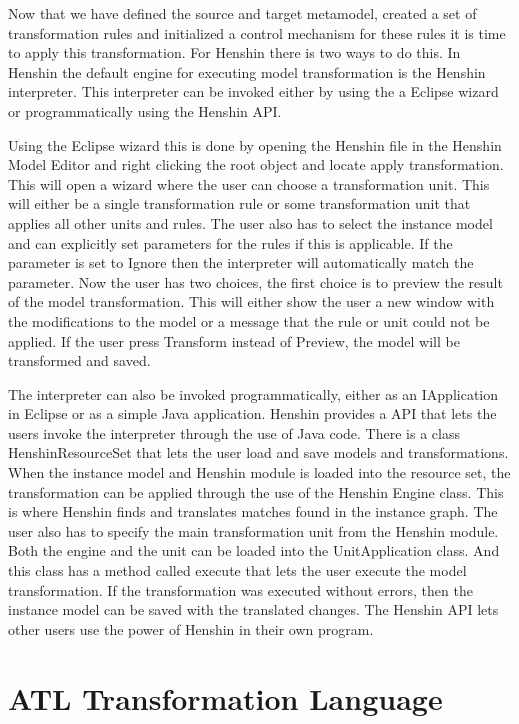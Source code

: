 Now that we have defined the source and target metamodel, created a set of
transformation rules and initialized a control mechanism for these rules it is
time to apply this transformation. For Henshin there is two ways to do this. In
Henshin the default engine for executing model transformation is the Henshin
interpreter. This interpreter can be invoked either by using the a Eclipse wizard
or programmatically using the Henshin API. 

Using the Eclipse wizard this is done by opening the Henshin file in the Henshin
Model Editor and right clicking the root object and locate apply transformation.
This will open a wizard where the user can choose a transformation unit. This
will either be a single transformation rule or some transformation unit that
applies all other units and rules. The user also has to select the instance
model and can explicitly set parameters for the rules if this is applicable. If
the parameter is set to Ignore then the interpreter will automatically match the
parameter. Now the user has two choices, the first choice is to preview the
result of the model transformation. This will either show the user a new window
with the modifications to the model or a message that the rule or unit could not
be applied. If the user press Transform instead of Preview, the model will be
transformed and saved.

The interpreter can also be invoked programmatically, either as an IApplication
in Eclipse or as a simple Java application. Henshin provides a API that lets the
users invoke the interpreter through the use of Java code. There is a class
HenshinResourceSet that lets the user load and save models and transformations.
When the instance model and Henshin module is loaded into the resource set, the
transformation can be applied through the use of the Henshin Engine class. This
is where Henshin finds and translates matches found in the instance graph. The
user also has to specify the main transformation unit from the Henshin module.
Both the engine and the unit can be loaded into the UnitApplication class. And
this class has a method called execute that lets the user execute the model
transformation. If the transformation was executed without errors, then the
instance model can be saved with the translated changes. The Henshin API lets
other users use the power of Henshin in their own program.

\section{ATL Transformation Language}

